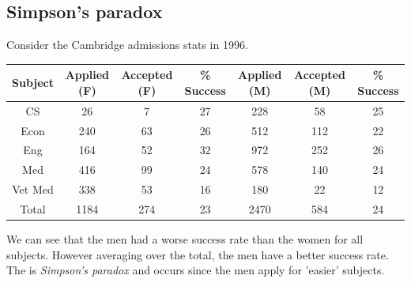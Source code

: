 \documentclass{article}
\begin{document}
\subsection{Simpson's paradox}
Consider the Cambridge admissions stats in 1996.
\begin{center}
	\begin{tabular}{c | c c c | c c c}
\hline
Subject & Applied (F) & Accepted (F) & \% Success & Applied (M) & Accepted (M) & \% Success \\
\hline
CS & 26 & 7 & 27 & 228 & 58 & 25 \\
Econ & 240 & 63 & 26 & 512 & 112 & 22 \\
Eng & 164 & 52 & 32 & 972 & 252 & 26 \\
Med & 416 & 99 & 24 & 578 & 140 & 24 \\
Vet Med & 338 & 53 & 16 & 180 & 22 & 12 \\
\hline 
Total & 1184 & 274 & 23 & 2470 & 584 & 24\\
\hline
  \end{tabular}
\end{center}
We can see that the men had a worse success rate than the women for all subjects. However averaging over the total, the men have a better success rate. The is \textit{Simpson's paradox} and occurs since the men apply for 'easier' subjects.
\end{document}
